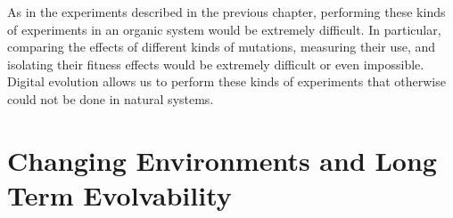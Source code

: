 \documentclass[PhD]{msu-thesis}
\begin{document}

As in the experiments described in the previous chapter, performing these kinds of experiments in an organic system would be extremely difficult. In particular, comparing the effects of different kinds of mutations, measuring their use, and isolating their fitness effects would be extremely difficult or even impossible. Digital evolution allows us to perform these kinds of experiments that otherwise could not be done in natural systems. 



\chapter{Changing Environments and Long Term Evolvability}
\label{chap:ce-longterm}
\end{document}
